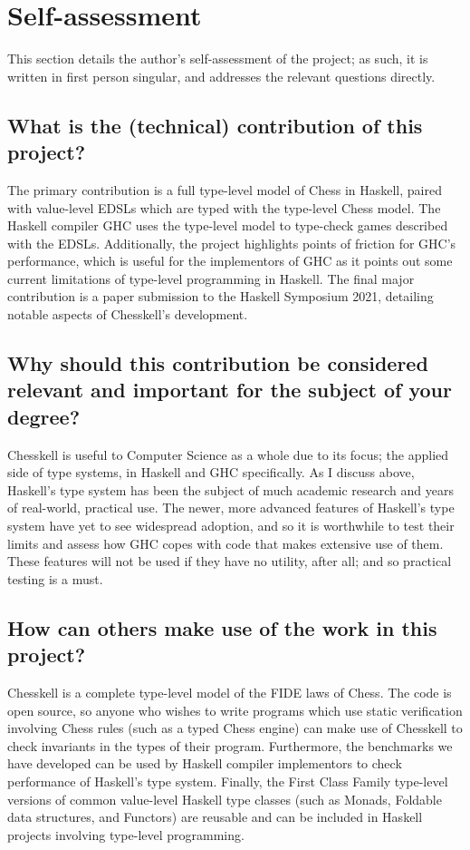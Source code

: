 \section{Self-assessment}

This section details the author's self-assessment of the project; as such, it is written in first person singular, and addresses the relevant questions directly.

\subsection{What is the (technical) contribution of this project?}

The primary contribution is a full type-level model of Chess in Haskell, paired with value-level EDSLs which are typed with the type-level Chess model. The Haskell compiler GHC uses the type-level model to type-check games described with the EDSLs. Additionally, the project highlights points of friction for GHC's performance, which is useful for the implementors of GHC as it points out some current limitations of type-level programming in Haskell. The final major contribution is a paper submission to the Haskell Symposium 2021, detailing notable aspects of Chesskell's development.

\subsection{Why should this contribution be considered relevant and important for the subject of your degree?}

Chesskell is useful to Computer Science as a whole due to its focus; the applied side of type systems, in Haskell and GHC specifically. As I discuss above, Haskell's type system has been the subject of much academic research and years of real-world, practical use. The newer, more advanced features of Haskell's type system have yet to see widespread adoption, and so it is worthwhile to test their limits and assess how GHC copes with code that makes extensive use of them. These features will not be used if they have no utility, after all; and so practical testing is a must.

\subsection{How can others make use of the work in this project?}

Chesskell is a complete type-level model of the FIDE laws of Chess. The code is open source, so anyone who wishes to write programs which use static verification involving Chess rules (such as a typed Chess engine) can make use of Chesskell to check invariants in the types of their program. Furthermore, the benchmarks we have developed can be used by Haskell compiler implementors to check performance of Haskell's type system. Finally, the First Class Family type-level versions of common value-level Haskell type classes (such as Monads, Foldable  data structures, and Functors) are reusable and can be included in Haskell projects involving type-level programming.


